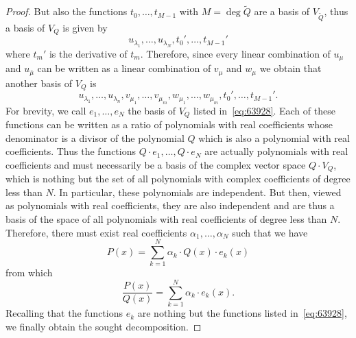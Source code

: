 \begin{proof}
But also the functions $t_0, \dots, t_{M-1}$ with $M=\deg \tilde Q$
are a basis of $V_{\tilde Q}$, thus a basis
of $V_Q$ is given by
\[
  u_{\lambda_1}, \dots, u_{\lambda_N},
  t_0', \dots, t_{M-1}'
\]
where $t_m'$ is the derivative of $t_m$.
Therefore, since every linear combination
of $u_{\mu}$ and $u_{\bar \mu}$ can be written
as a linear combination of $v_\mu$ and $w_\mu$
we obtain that another basis of $V_Q$ is
\begin{equation}\label{eq:63928}
  u_{\lambda_1}, \dots, u_{\lambda_n},
  v_{\mu_1}, \dots, v_{\mu_m},
  w_{\mu_1}, \dots, w_{\mu_m},
  t_0', \dots, t_{M-1}'.
\end{equation}
For brevity, we call $e_1, \dots, e_N$
the basis of $V_Q$ listed in~\eqref{eq:63928}.
Each of these functions can be written as
a ratio of polynomials with real coefficients
whose denominator is a divisor of the polynomial $Q$
which is also a polynomial with real coefficients.
Thus the functions $Q\cdot e_1, \dots, Q\cdot e_N$
are actually polynomials with real coefficients
and must necessarily be a basis of the complex vector space $Q\cdot V_Q$, which
is nothing but the set
of all polynomials with complex coefficients
of degree less than $N$. In particular, these polynomials
are independent.
But then, viewed as polynomials with
real coefficients, they are also independent and are thus
a basis of the space of all polynomials with real coefficients
of degree less than $N$.
Therefore, there must exist real coefficients $\alpha_1, \dots, \alpha_N$
such that we have
\[
  P(x) = \sum_{k=1}^N \alpha_k\cdot Q(x)\cdot e_k(x)
\]
from which
\[
  \frac{P(x)}{Q(x)} = \sum_{k=1}^N \alpha_k \cdot e_k(x).
\]
Recalling that the functions $e_k$ are nothing but the functions
listed in~\eqref{eq:63928}, we finally obtain the sought decomposition.
\end{proof}